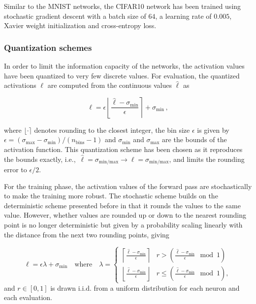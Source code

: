 \documentclass[10pt]{article}
\theoremstyle{definition}
\theoremstyle{plain}
\begin{document}
Similar to the MNIST networks, the CIFAR10 network has been trained using stochastic gradient descent with a batch size of $64$, a learning rate of $0.005$, Xavier weight initialization and cross-entropy loss.

\subsubsection{Quantization schemes}
\label{apx:quantization}

In order to limit the information capacity of the networks, the activation values have been quantized to very few discrete values. For evaluation, the quantized activations $\ell$ are computed from the continuous values $\hat{\ell}$ as

\begin{equation}
    \ell = \epsilon  \left\lfloor \frac{\hat{\ell} - \sigma_\mathrm{min}}{\epsilon} \right\rceil + \sigma_\mathrm{min}\,,
\end{equation}

where $\lfloor \cdot \rceil$ denotes rounding to the closest integer, the bin size $\epsilon$ is given by $\epsilon = (\sigma_\mathrm{max} - \sigma_\mathrm{min})/(n_\mathrm{bins} - 1)$ and $\sigma_\mathrm{min}$ and $\sigma_\mathrm{max}$ are the bounds of the activation function. This quantization scheme has been chosen as it reproduces the bounds exactly, i.e.,~$\hat{\ell} = \sigma_\mathrm{min/max} \to \ell = \sigma_\mathrm{min/max}$, and limits the rounding error to $\epsilon/2$.

For the training phase, the activation values of the forward pass are stochastically to make the training more robust. The stochastic scheme builds on the deterministic scheme presented before in that it rounds the values to the same value. However, whether values are rounded up or down to the nearest rounding point is no longer deterministic but given by a probability scaling linearly with the distance from the next two rounding points, giving

\begin{equation}
    \ell = \epsilon\lambda + \sigma_\mathrm{min}\quad \text{where}\quad \lambda = 
    \begin{cases} 
        \left\lceil \frac{\hat{\ell} - \sigma_\mathrm{min}}{\epsilon} \right\rceil & r > \left(\frac{\hat{\ell} - \sigma_\mathrm{min}}{\epsilon} \mod 1\right)\\[0.5cm]
      \left\lfloor \frac{\hat{\ell} - \sigma_\mathrm{min}}{\epsilon} \right\rfloor & r \leq \left(\frac{\hat{\ell} - \sigma_\mathrm{min}}{\epsilon} \mod 1 \right),
   \end{cases}
\end{equation}
and $r \in [0, 1]$ is drawn i.i.d. from a uniform distribution for each neuron and each evaluation.
\end{document}

